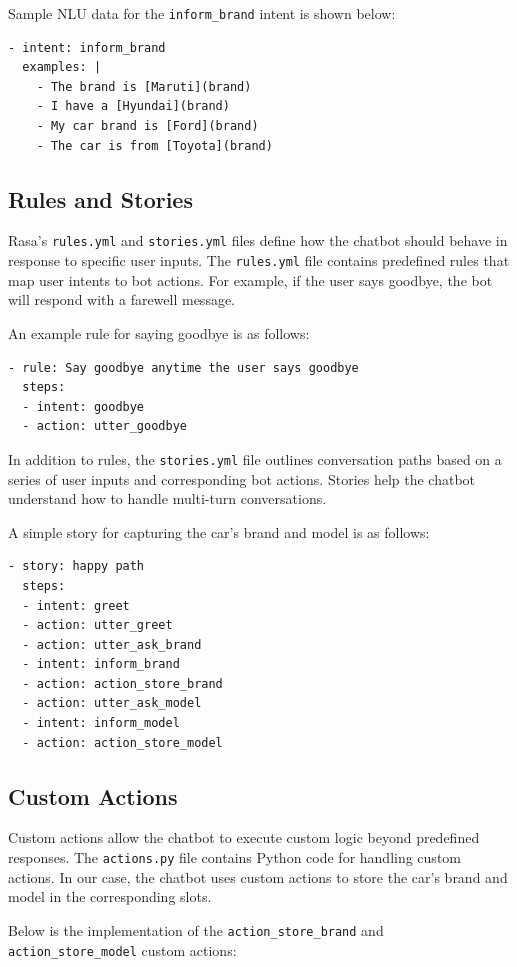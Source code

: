 \documentclass[a4paper,12pt]{article}
\begin{document}
Sample NLU data for the \texttt{inform\_brand} intent is shown below:

\begin{verbatim}
- intent: inform_brand
  examples: |
    - The brand is [Maruti](brand)
    - I have a [Hyundai](brand)
    - My car brand is [Ford](brand)
    - The car is from [Toyota](brand)
\end{verbatim}

\subsection{Rules and Stories}
Rasa's \texttt{rules.yml} and \texttt{stories.yml} files define how the chatbot should behave in response to specific user inputs. The \texttt{rules.yml} file contains predefined rules that map user intents to bot actions. For example, if the user says goodbye, the bot will respond with a farewell message.

An example rule for saying goodbye is as follows:

\begin{verbatim}
- rule: Say goodbye anytime the user says goodbye
  steps:
  - intent: goodbye
  - action: utter_goodbye
\end{verbatim}

In addition to rules, the \texttt{stories.yml} file outlines conversation paths based on a series of user inputs and corresponding bot actions. Stories help the chatbot understand how to handle multi-turn conversations.

A simple story for capturing the car's brand and model is as follows:

\begin{verbatim}
- story: happy path
  steps:
  - intent: greet
  - action: utter_greet
  - action: utter_ask_brand
  - intent: inform_brand
  - action: action_store_brand
  - action: utter_ask_model
  - intent: inform_model
  - action: action_store_model
\end{verbatim}

\subsection{Custom Actions}
Custom actions allow the chatbot to execute custom logic beyond predefined responses. The \texttt{actions.py} file contains Python code for handling custom actions. In our case, the chatbot uses custom actions to store the car's brand and model in the corresponding slots.

Below is the implementation of the \texttt{action\_store\_brand} and \texttt{action\_store\_model} custom actions:
\end{document}
